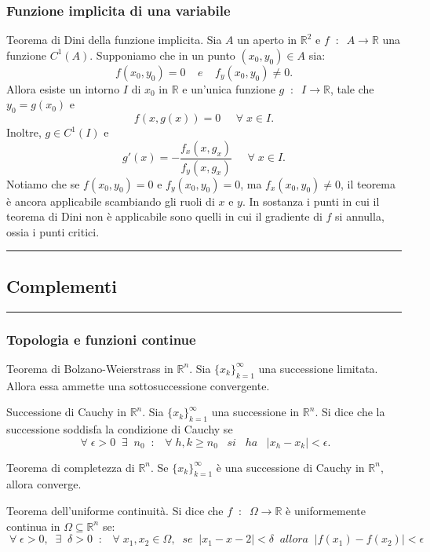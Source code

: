 \subsubsection*{Funzione implicita di una variabile}
Teorema di Dini della funzione implicita. Sia $A$ un aperto in $\mathbb{R}^2$ e $f \;\;:\;\; A \rightarrow \mathbb{R}$ una funzione $C^1(A)$. Supponiamo che in un punto $(x_0,y_0) \in A$ sia:
\[
    f(x_0,y_0)= 0 \;\;\;\; e \;\;\;\; f_y(x_0,y_0) \neq 0.
\] 
Allora esiste un intorno $I$ di $x_0$ in $\mathbb{R}$ e un'unica funzione $g \;\;:\;\; I \rightarrow \mathbb{R}$, tale che $y_0=g(x_0)$ e
\[
    f(x,g(x)) = 0 \;\;\;\; \;\forall\;x \in I.
\]
Inoltre, $g \in C^1(I)$ e 
\[
    g'(x) = - \frac{f_x(x,g_x)}{f_y(x,g_x)} \;\;\;\; \;\forall\;x \in I.
\]
Notiamo che se $f(x_0,y_0) = 0$ e $f_y(x_0, y_0) = 0$, ma $f_x(x_0, y_0) \neq 0$, il teorema è ancora applicabile scambiando gli ruoli di $x$ e $y$.\newline
In sostanza i punti in cui il teorema di Dini non è applicabile sono quelli in cui il gradiente di $f$ si annulla, ossia i punti critici. \newline
\rule{\textwidth}{2pt}
\subsection*{Complementi}
\rule{\textwidth}{0.4pt}
\subsubsection*{Topologia e funzioni continue}
Teorema di Bolzano-Weierstrass in $\mathbb{R}^n$. Sia $\{x_k\}_{k=1}^\infty$ una successione limitata. Allora essa ammette una sottosuccessione convergente.\newline

Successione di Cauchy in $\mathbb{R}^n$. Sia $\{x_k\}_{k=1}^\infty$ una successione in $\mathbb{R}^n$. Si dice che la successione soddisfa la condizione di Cauchy se
\[
    \;\forall\;\epsilon > 0 \;\;\exists\;\; n_0 \;\;:\;\;\;\forall\;h,k \geq n_0 \;\;\; si \;\;\; ha \;\;\;|x_h -x_k|<\epsilon.
\]
\newline

Teorema di completezza di $\mathbb{R}^n$. Se $\{x_k\}_{k=1}^\infty$ è una successione di Cauchy in $\mathbb{R}^n$, allora converge.\newline

Teorema dell'uniforme continuità. Si dice che $f \;\;:\;\; \Omega \rightarrow \mathbb{R}$ è uniformemente continua in $\Omega \subseteq \mathbb{R}^n$ se:
\[
    \;\forall\;\epsilon>0,\;\;\exists\;\;\delta>0 \;\;:\;\; \;\forall\;x_1,x_2 \in\Omega,\;\;se \;\; |x_1- x-2| <\delta \;\;allora \;\;|f(x_1) -f(x_2)|<\epsilon
\]
\newline

